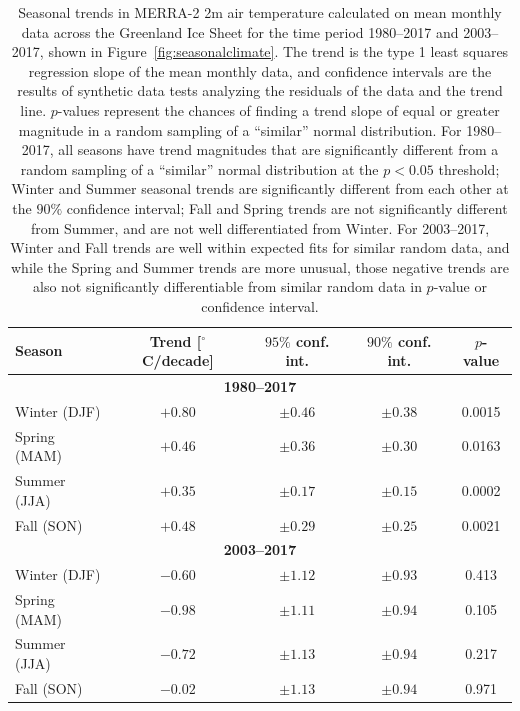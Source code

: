 \documentclass[11pt]{report}
\begin{document}
\begin{table}[!h]
\begin{center}
\begin{tabular}{ |l|c|c|c|c| } 
\hline
\bfseries{Season} & \bfseries{Trend [$^{\circ}$C/decade]} & \bfseries{$95\%$ conf. int.} & \bfseries{$90\%$ conf. int.} & \bfseries{$p$-value}\\              
\hline
\multicolumn{5}{|c|}{\bfseries{1980--2017}} \\
\hline
Winter (DJF)	& $+0.80$	& $\pm0.46$	& $\pm0.38$	& 	0.0015 \\ 	
\hline
Spring (MAM)	& $+0.46$	& $\pm0.36$	& $\pm0.30$	&	0.0163 \\
\hline
Summer (JJA)	& $+0.35$	& $\pm0.17$	& $\pm0.15$	&	0.0002\\
\hline
Fall (SON)	& $+0.48$	& $\pm0.29$	& $\pm0.25$	&	0.0021\\
\hline
\multicolumn{5}{|c|}{\bfseries{2003--2017}} \\
\hline
Winter (DJF)	& $-0.60$	& $\pm 1.12 $	& $\pm 0.93$	& 	0.413 \\ 	
\hline
Spring (MAM)	& $-0.98$	& $\pm 1.11$	& $\pm 0.94$	&	0.105  \\
\hline
Summer (JJA)	& $-0.72$	& $\pm 1.13$	& $\pm 0.94$	&	0.217\\
\hline
Fall (SON)		& $-0.02$	& $\pm 1.13$	& $\pm 0.94$	&	0.971\\
\hline\end{tabular}
\caption[Seasonal 2m temperature trends over the Greenland Ice Sheet: 1980--2017]{Seasonal trends in MERRA-2 2m air temperature calculated on mean monthly data across the Greenland Ice Sheet for the time period 1980--2017 and 2003--2017, shown in Figure~\ref{fig:seasonalclimate}. The trend is the type 1 least squares regression slope of the mean monthly data, and confidence intervals are the results of synthetic data tests analyzing the residuals of the data and the trend line. $p$-values represent the chances of finding a trend slope of equal or greater magnitude in a random sampling of a ``similar'' normal distribution. For 1980--2017, all seasons have trend magnitudes that are significantly different from a random sampling of a ``similar'' normal distribution at the $p < 0.05$ threshold; Winter and Summer seasonal trends are significantly different from each other at the $90\%$ confidence interval; Fall and Spring trends are not significantly different from Summer, and are not well differentiated from Winter. For 2003--2017, Winter and Fall trends are well within expected fits for similar random data, and while the Spring and Summer trends are more unusual, those negative trends are also not significantly differentiable from similar random data in $p$-value or confidence interval. \label{tab:seasonaltrends}}
\end{center}
\end{table}
\end{document}
